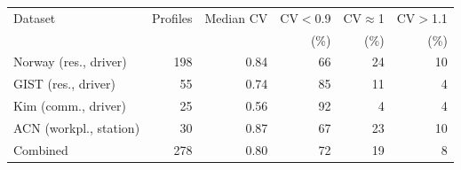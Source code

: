 \begin{tabular}{lrrrrr}
\toprule
Dataset & Profiles & Median CV & CV$<$0.9 & CV$\approx$1 & CV$>$1.1 \\
        &          &           & (\%)     & (\%)        & (\%) \\
\midrule
Norway (res., driver) & 198 & 0.84 & 66 & 24 & 10 \\
GIST (res., driver) & 55 & 0.74 & 85 & 11 & 4 \\
Kim (comm., driver) & 25 & 0.56 & 92 & 4 & 4 \\
ACN (workpl., station) & 30 & 0.87 & 67 & 23 & 10 \\
Combined & 278 & 0.80 & 72 & 19 & 8 \\
\bottomrule
\end{tabular}

